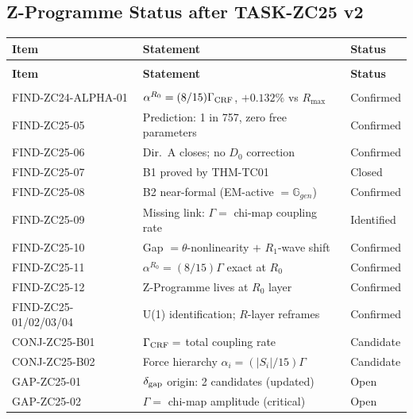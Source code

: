 \documentclass[12pt, a4paper]{article}
\begin{document}
\subsection{Z-Programme Status after TASK-ZC25 v2}
\label{zc25:sec:status}

\begin{derivedbox}[title={Z-Programme Status (ZC25 v2)}]
{\small
\setlength{\LTpre}{4pt}
\setlength{\LTpost}{4pt}
\renewcommand{\arraystretch}{1.30}
\begin{longtable}{>{\raggedright\arraybackslash}p{3.5cm}
                  >{\raggedright\arraybackslash}p{7.0cm}
                  >{\centering\arraybackslash}p{1.5cm}}
\toprule
\textbf{Item} & \textbf{Statement} & \textbf{Status} \\
\midrule
\endfirsthead
\multicolumn{3}{l}{\small\textit{(continued)}}\\[4pt]
\toprule
\textbf{Item} & \textbf{Statement} & \textbf{Status} \\
\midrule
\endhead
\midrule
\multicolumn{3}{r}{\small\textit{(continues)}}\\
\endfoot
\bottomrule
\endlastfoot
FIND-ZC24-ALPHA-01 & $\alpha^{R_0}=(8/15)\Gamma_{\rm CRF}$,
  $+0.132\%$ vs $R_{\max}$ & Confirmed \\
\midrule
FIND-ZC25-05 & Prediction: 1 in 757, zero free parameters
  & Confirmed \\
FIND-ZC25-06 & Dir.~A closes; no $D_0$ correction & Confirmed \\
FIND-ZC25-07 & B1 proved by THM-TC01 & Closed \\
FIND-ZC25-08 & B2 near-formal (EM-active $=\mathbb{G}_{gen}$)
  & Confirmed \\
FIND-ZC25-09 & Missing link: $\Gamma=$ chi-map coupling rate
  & Identified \\
FIND-ZC25-10 & Gap $= \theta$-nonlinearity $+$ $R_1$-wave shift
  & Confirmed \\
FIND-ZC25-11 & $\alpha^{R_0}=(8/15)\Gamma$ exact at $R_0$
  & Confirmed \\
FIND-ZC25-12 & Z-Programme lives at $R_0$ layer & Confirmed \\
FIND-ZC25-01/02/03/04 & U(1) identification; $R$-layer reframes
  & Confirmed \\
\midrule
CONJ-ZC25-B01 & $\Gamma_{\rm CRF}=$ total coupling rate & Candidate \\
CONJ-ZC25-B02 & Force hierarchy $\alpha_i=(|S_i|/15)\Gamma$
  & Candidate \\
\midrule
GAP-ZC25-01 & $\delta_{\rm gap}$ origin: 2 candidates (updated)
  & Open \\
GAP-ZC25-02 & $\Gamma=$ chi-map amplitude (critical) & Open \\
\end{longtable}
}
\vspace{-6pt}
\end{derivedbox}
\end{document}
